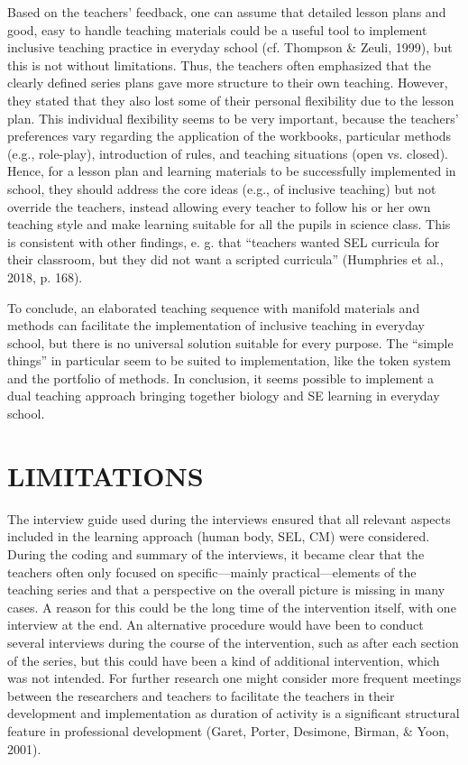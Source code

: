 \documentclass[11.5pt]{sig-alternate} %
\begin{document}
\begin{large}
Based on the teachers’ feedback, one can assume that detailed lesson plans and good, easy to handle teaching materials could be a useful tool to implement inclusive teaching practice in everyday school (cf. Thompson \& Zeuli, 1999), but this is not without limitations. Thus, the teachers often emphasized that the clearly defined series plans gave more structure to their own teaching. However, they stated that they also lost some of their personal flexibility due to the lesson plan. This individual flexibility seems to be very important, because the teachers’ preferences vary regarding the application of the workbooks, particular methods (e.g., role-play), introduction of rules, and teaching situations (open vs. closed). Hence, for a lesson plan and learning materials to be successfully implemented in school, they should address the core ideas (e.g., of inclusive teaching) but not override the teachers, instead allowing every teacher to follow his or her own teaching style and make learning suitable for all the pupils in science class. This is consistent with other findings, e. g. that “teachers wanted SEL curricula for their classroom, but they did not want a scripted curricula” (Humphries et al., 2018, p. 168).

To conclude, an elaborated teaching sequence with manifold materials and methods can facilitate the implementation of inclusive teaching in everyday school, but there is no universal solution suitable for every purpose. The “simple things” in particular seem to be suited to implementation, like the token system and the portfolio of methods. In conclusion, it seems possible to implement a dual teaching approach bringing together biology and SE learning in everyday school.

\section*{LIMITATIONS}

The interview guide used during the interviews ensured that all relevant aspects included in the learning approach (human body, SEL, CM) were considered. During the coding and summary of the interviews, it became clear that the teachers often only focused on specific—mainly practical—elements of the teaching series and that a perspective on the overall picture is missing in many cases. A reason for this could be the long time of the intervention itself, with one interview at the end. An alternative procedure would have been to conduct several interviews during the course of the intervention, such as after each section of the series, but this could have been a kind of additional intervention, which was not intended. For further research one might consider more frequent meetings between the researchers and teachers to facilitate the teachers in their development and implementation as duration of activity is a significant structural feature in professional development (Garet, Porter, Desimone, Birman, \& Yoon, 2001).


\end{large}
\end{document}
